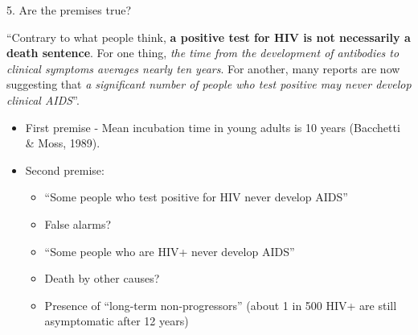 \documentclass{beamer}
\begin{document}
\begin{frame}{5. Are the premises true?}

	``Contrary to what people think, \textbf{a positive test for HIV is not necessarily a death sentence}. For one thing, \emph{the time from the development of antibodies to clinical symptoms averages nearly ten years}. For another, many reports are now suggesting that \emph{a significant number of people who test positive may never develop clinical AIDS}''.

\begin{itemize}
\item First premise - Mean incubation time in young adults is 10 years (Bacchetti \& Moss, 1989).
\item Second premise:
\begin{itemize}
\item ``Some people who test positive for HIV never develop AIDS''
\item False alarms?
\item ``Some people who are HIV+ never develop AIDS''
\item Death by other causes?
\item Presence of ``long-term non-progressors'' (about 1 in 500 HIV+ are still asymptomatic after 12 years)
\end{itemize}
\end{itemize}
\end{frame}




\end{document}

